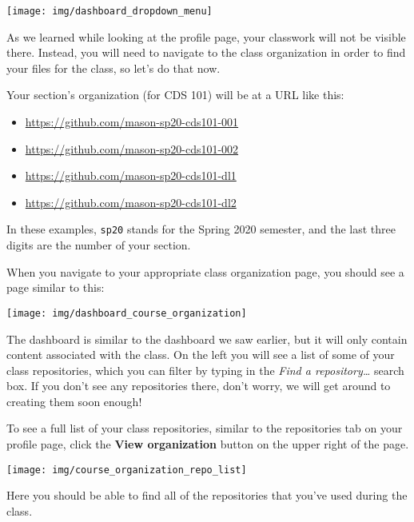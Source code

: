 \documentclass[
]{book}
\providecommand{\tightlist}{%
  \setlength{\itemsep}{0pt}\setlength{\parskip}{0pt}}
\begin{document}
\begin{center}\texttt{[image: img/dashboard\_dropdown\_menu]} \end{center}

As we learned while looking at the profile page, your classwork will not be visible there.
Instead, you will need to navigate to the class organization in order to find your files for the class, so let's do that now.

Your section's organization (for CDS 101) will be at a URL like this:

\begin{itemize}
\tightlist
\item
  \url{https://github.com/mason-sp20-cds101-001}
\item
  \url{https://github.com/mason-sp20-cds101-002}
\item
  \url{https://github.com/mason-sp20-cds101-dl1}
\item
  \url{https://github.com/mason-sp20-cds101-dl2}
\end{itemize}

In these examples, \texttt{sp20} stands for the Spring 2020 semester, and the last three digits are the number of your section.

When you navigate to your appropriate class organization page, you should see a page similar to this:

\begin{center}\texttt{[image: img/dashboard\_course\_organization]} \end{center}

The dashboard is similar to the dashboard we saw earlier, but it will only contain content associated with the class.
On the left you will see a list of some of your class repositories, which you can filter by typing in the \emph{Find a repository\ldots{}} search box.
If you don't see any repositories there, don't worry, we will get around to creating them soon enough!

To see a full list of your class repositories, similar to the repositories tab on your profile page, click the \textbf{View organization} button on the upper right of the page.

\begin{center}\texttt{[image: img/course\_organization\_repo\_list]} \end{center}

Here you should be able to find all of the repositories that you've used during the class.
\end{document}
